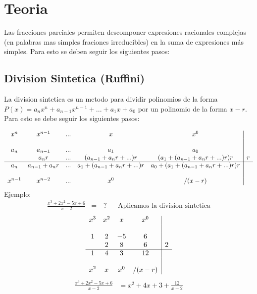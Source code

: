 \documentclass{templateNote}
\begin{document}
\portada
\margenes %


\section{Teoria}
\indent

Las fracciones parciales permiten descomponer expresiones racionales complejas (en palabras mas simples fraciones irreducibles) en la suma de expresiones más simples. Para esto se deben seguir los siguientes pasos:
\subsection{Division Sintetica (Ruffini)}
\indent
La division sintetica es un metodo para dividir polinomios de la forma $P(x) = a_nx^n + a_{n-1}x^{n-1} + ... + a_1x + a_0$ por un polinomio de la forma $x - r$. Para esto se debe seguir los siguientes pasos:

\[
\begin{array}{ccccc|c}
  x^n & x^{n-1} & ... & x & x^0\\
  &&&&&\\
  a_n & a_{n-1} & ... & a_1 & a_0 \\ 
  & a_n r & ... & (a_{n-1} + a_n r + ...)r & (a_1 + (a_{n-1} + a_n r + ...)r)r & r\\ 
  \cline{1-6}
  a_n & a_{n-1} + a_n r & ... & a_1 + (a_{n-1} + a_n r + ...)r & a_0 + (a_1 + (a_{n-1} + a_n r + ...)r)r\\
  &&&&&\\
  x^{n-1} & x^{n-2} & ... & x^0 & /(x-r) \\ 
\end{array}
\]
Ejemplo:
\begin{align*}
    \frac{x^3 + 2x^2 - 5x + 6}{x-2} &= \quad \text{?} && \text{Aplicamos la division sintetica}
\end{align*}
\[
\begin{array}{cccc|c}
  x^3 & x^2 & x & x^0\\
  &&&&\\
  1 & 2 & -5 & 6 \\ 
    & 2 & 8 & 6 & 2\\ 
  \cline{1-5}
  1 & 4 & 3 & 12 \\
  &&&&\\
  x^2 & x & x^0 & /(x-r)
\end{array}
\]
\begin{align*}
    \frac{x^3 + 2x^2 - 5x + 6}{x-2} &= x^2 + 4x + 3 + \frac{12}{x-2}\\
\end{align*}
\end{document}
